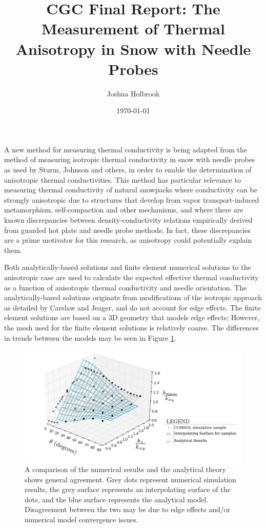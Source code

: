 \documentclass{article}
\title{CGC Final Report: The Measurement of Thermal Anisotropy in Snow with Needle Probes}
\author{Joshua Holbrook}
\date{\today}
\begin{document}
\maketitle

A new method for measuring thermal conductivity is being adapted from 
the method of measuring isotropic thermal conductivity in snow with needle
probes as used by Sturm, Johnson and others, in order to enable the
determination of anisotropic thermal conductivities. \cite{sturm1, sturm2} This
method has particular relevance to measuring thermal conductivity of natural
snowpacks where conductivity can be strongly anisotropic due to structures that
develop from vapor transport-induced metamorphism, self-compaction and other
mechanisms, and where there are known discrepancies between density-conductivity
relations empirically derived from guarded hot plate and needle probe methods;
In fact, these discrepancies are a prime motivator for this research, as
anisotropy could potentially explain them.

Both analytically-based solutions and finite element numerical solutions to the
anisotropic case are used to calculate the expected effective thermal
conductivity as a function of anisotropic thermal conductivity and needle
orientation. The analytically-based solutions originate from modifications of 
the isotropic approach as detailed by Carslaw and Jeager, and do not account for
edge effects. \cite{basictheory} The finite element solutions are based on a 3D
geometry that models edge effects; However, the mesh used for the finite
element solutions is relatively coarse. The differences in trends between the
models may be seen in Figure \ref{fig:numvanal}.

\begin{figure}[h]
\centering
\includegraphics[width=\textwidth]{numvanal.png}
\caption{A comparison of the numerical results and the analytical theory shows
general agreement. Grey dots represent numerical simulation results, the grey surface represents an interpolating surface of the dots, and the blue surface represents the analytical model. Disagreement between the two may be due to edge effects and/or numerical
model convergence issues.}
\label{fig:numvanal}
\end{figure}
\end{document}
